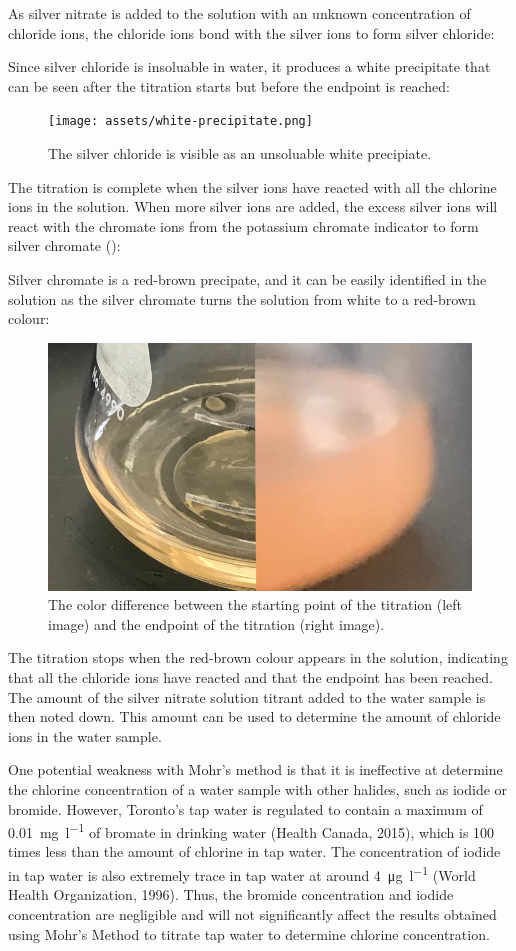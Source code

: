 \documentclass[11pt]{article}
\begin{document}
As silver nitrate is added to the solution with an unknown concentration of chloride ions, the chloride ions bond with the silver ions to form silver chloride:

\centerline{}

Since silver chloride is insoluable in water, it produces a white precipitate that can be seen after the titration starts but before the endpoint is reached:

\begin{figure}[H]
	\centering
	\texttt{[image: assets/white-precipitate.png]}
	\caption{The silver chloride is visible as an unsoluable white precipiate.}
\end{figure}

The titration is complete when the silver ions have reacted with all the chlorine ions in the solution. When more silver ions are added, the excess silver ions will react with the chromate ions from the potassium chromate indicator to form silver chromate ():

\centerline{}

Silver chromate is a red-brown precipate, and it can be easily identified in the solution as the silver chromate turns the solution from white to a red-brown colour:

\begin{figure}[H]
	\centering
	\includegraphics[width=0.3\linewidth]{assets/color-difference}
	\caption{The color difference between the starting point of the titration (left image) and the endpoint of the titration (right image).}
\end{figure}

The titration stops when the red-brown colour appears in the solution, indicating that all the chloride ions have reacted and that the endpoint has been reached. The amount of the silver nitrate solution titrant added to the water sample is then noted down. This amount can be used to determine the amount of chloride ions in the water sample.

One potential weakness with Mohr's method is that it is ineffective at determine the chlorine concentration of a water sample with other halides, such as iodide or bromide. However, Toronto's tap water is regulated to contain a maximum of \SI{0.01}{\milli\gram\per\litre} of bromate in drinking water (Health Canada, 2015), which is 100 times less than the amount of chlorine in tap water. The concentration of iodide in tap water is also extremely trace in tap water at around \SI{4}{\micro\gram\per\litre} (World Health Organization, 1996). Thus, the bromide concentration and iodide concentration are negligible and will not significantly affect the results obtained using Mohr's Method to titrate tap water to determine chlorine concentration.
\end{document}
